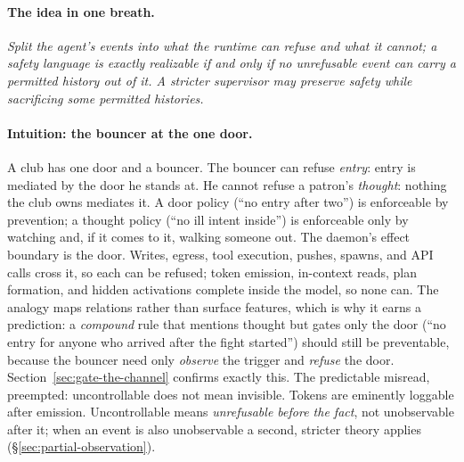 \documentclass[11pt,a4paper]{article}
\theoremstyle{definition}
\theoremstyle{remark}
\begin{document}
\paragraph{The idea in one breath.}
\emph{Split the agent's events into what the runtime can refuse and what it cannot; a safety
language is exactly realizable if and only if no unrefusable event can carry
a permitted history out of it. A stricter supervisor may preserve safety while
sacrificing some permitted histories.}

\paragraph{Intuition: the bouncer at the one door.}
A club has one door and a bouncer. The bouncer can refuse \emph{entry}: entry is mediated by
the door he stands at. He cannot refuse a patron's \emph{thought}: nothing the club owns
mediates it. A door policy (``no entry after two'') is enforceable by prevention; a thought
policy (``no ill intent inside'') is enforceable only by watching and, if it comes to it,
walking someone out. The daemon's effect boundary is the door. Writes, egress, tool execution,
pushes, spawns, and API calls cross it, so each can be refused; token emission, in-context
reads, plan formation, and hidden activations complete inside the model, so none can. The
analogy maps relations rather than surface features, which is why it earns a prediction: a
\emph{compound} rule that mentions thought but gates only the door (``no entry for anyone
who arrived after the fight started'') should still be preventable, because the bouncer need
only \emph{observe} the trigger and \emph{refuse} the door. Section~\ref{sec:gate-the-channel}
confirms exactly this. The predictable misread, preempted: uncontrollable does not mean
invisible. Tokens are eminently loggable after emission. Uncontrollable means
\emph{unrefusable before the fact}, not unobservable after it; when an event is also
unobservable a second, stricter theory applies (\S\ref{sec:partial-observation}).
\end{document}
